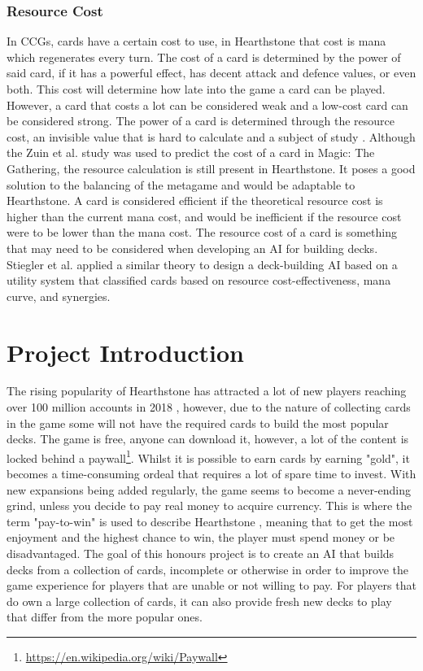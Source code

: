 \documentclass{report} %
\begin{document}
\subsubsection{Resource Cost}
	In CCGs, cards have a certain cost to use, in Hearthstone that cost is mana which regenerates every turn. The cost of a card is determined by the power of said card, if it has a powerful effect, has decent attack and defence values, or even both. This cost will determine how late into the game a card can be played. However, a card that costs a lot can be considered weak and a low-cost card can be considered strong. The power of a card is determined through the resource cost, an invisible value that is hard to calculate and a subject of study \cite{Zuin2019}. Although the Zuin et al. study was used to predict the cost of a card in Magic: The Gathering, the resource calculation is still present in Hearthstone. It poses a good solution to the balancing of the metagame and would be adaptable to Hearthstone. A card is considered efficient if the theoretical resource cost is higher than the current mana cost, and would be inefficient if the resource cost were to be lower than the mana cost. The resource cost of a card is something that may need to be considered when developing an AI for building decks. Stiegler et al. \cite{Stiegler2017} applied a similar theory to design a deck-building AI based on a utility system that classified cards based on resource cost-effectiveness, mana curve, and synergies.
\section{Project Introduction}
	 The rising popularity of Hearthstone has attracted a lot of new players reaching over 100 million accounts in 2018 \cite{100mil}, however, due to the nature of collecting cards in the game some will not have the required cards to build the most popular decks. The game is free, anyone can download it, however, a lot of the content is locked behind a paywall\footnote{\url{https://en.wikipedia.org/wiki/Paywall}}. Whilst it is possible to earn cards by earning "gold", it becomes a time-consuming ordeal that requires a lot of spare time to invest. With new expansions being added regularly, the game seems to become a never-ending grind, unless you decide to pay real money to acquire currency. This is where the term "pay-to-win" is used to describe Hearthstone \cite{Howard2019}, meaning that to get the most enjoyment and the highest chance to win, the player must spend money or be disadvantaged. The goal of this honours project is to create an AI that builds decks from a  collection of cards, incomplete or otherwise in order to improve the game experience for players that are unable or not willing to pay. For players that do own a large collection of cards, it can also provide fresh new decks to play that differ from the more popular ones.
\end{document}
